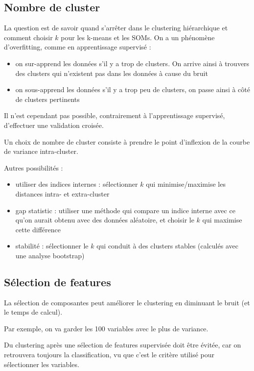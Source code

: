 		
	\subsection{Nombre de cluster}
	
	La question est de savoir quand s'arrêter dans le clustering hiérarchique et comment choisir $k$ pour les k-means et les SOMs. On a un phénomène d'overfitting, comme en apprentissage supervisé :
	
	\begin{itemize}
		\item on sur-apprend les données s'il y a trop de clusters. On arrive ainsi à trouvers des clusters qui n'existent pas dans les données à cause du bruit
		\item on sous-apprend les données s'il y a trop peu de clusters, on passe ainsi à côté de clusters pertinents
	\end{itemize}
	
	Il n'est cependant pas possible, contrairement à l'apprentissage supervisé, d'effectuer une validation croisée.
	
	Un choix de nombre de cluster consiste à prendre le point d'inflexion de la courbe de variance intra-cluster.
	
	
	
	Autres possibilités :
	
	\begin{itemize}
		\item utiliser des indices internes : sélectionner $k$ qui minimise/maximise les distances intra- et extra-cluster
		\item gap statistic : utiliser une méthode qui compare un indice interne avec ce qu'on aurait obtenu avec des données aléatoire, et choisir le $k$ qui maximise cette différence
		\item stabilité : sélectionner le $k$ qui conduit à des clusters stables (calculés avec une analyse bootstrap)
	\end{itemize}
	
	\subsection{Sélection de features}
	
	La sélection de composantes peut améliorer le clustering en diminuant le bruit (et le temps de calcul).
	
	Par exemple, on va garder les 100 variables avec le plus de variance.
	
	Du clustering après une sélection de features supervisée doit être évitée, car on retrouvera toujours la classification, vu que c'est le critère utilisé pour sélectionner les variables.
	

